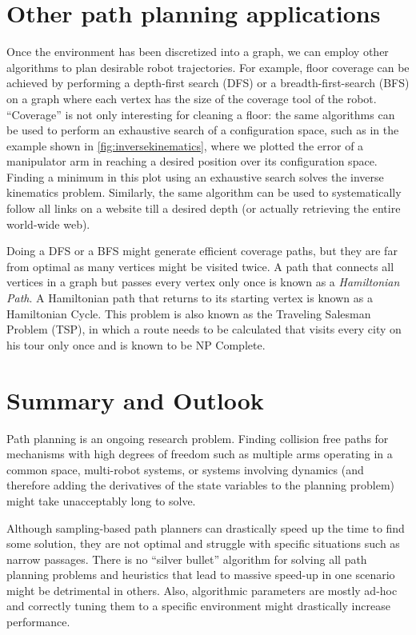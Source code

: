 \section{Other path planning applications}

Once the environment has been discretized into a graph, we can employ other algorithms to plan desirable robot trajectories. For example, floor coverage can be achieved by performing a depth-first search (DFS) or a breadth-first-search (BFS) on a graph where each vertex has the size of the coverage tool of the robot. ``Coverage'' is not only interesting for cleaning a floor: the same algorithms can be used to perform an exhaustive search of a configuration space, such as in the example shown in \cref{fig:inversekinematics}, where we plotted the error of a manipulator arm in reaching a desired position over its configuration space. Finding a minimum in this plot using an exhaustive search solves the inverse kinematics problem. Similarly, the same algorithm can be used to systematically follow all links on a website till a desired depth (or actually retrieving the entire world-wide web).

Doing a DFS or a BFS might generate efficient coverage paths, but they are far from optimal as many vertices might be visited twice. A path that connects all vertices in a graph but passes every vertex only once is known as a \textsl{Hamiltonian Path}. A Hamiltonian path that returns to its starting vertex is known as a Hamiltonian Cycle. This problem is also known as the Traveling Salesman Problem (TSP), in which a route needs to be calculated that visits every city on his tour only once and is known to be NP Complete.

\section{Summary and Outlook}
Path planning is an ongoing research problem. Finding collision free paths for mechanisms with high degrees of freedom such as multiple arms operating in a common space, multi-robot systems, or systems involving dynamics (and therefore adding the derivatives of the state variables to the planning problem) might take unacceptably long to solve.

Although sampling-based path planners can drastically speed up the time to find some solution, they are not optimal and struggle with specific situations such as narrow passages. There is no ``silver bullet'' algorithm for solving all path planning problems and heuristics that lead to massive speed-up in one scenario might be detrimental in others. Also, algorithmic parameters are mostly ad-hoc and correctly tuning them to a specific environment might drastically increase performance.



